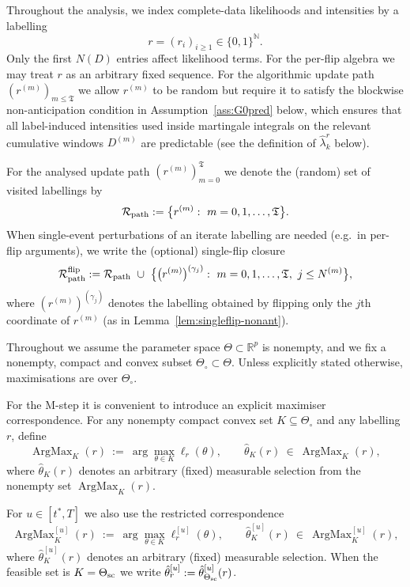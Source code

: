 \documentclass{statsoc}
\newcommand{\bbR}{\mathbb{R}}
\newcommand{\1}{\mathbbm{1}}
\newcommand{\bbN}{\mathbb{N}}
\newcommand{\Tmax}{\mathfrak{T}}
\begin{document}
Throughout the analysis, we index complete-data likelihoods and intensities by a labelling
\[
r=(r_i)_{i\ge 1}\in\{0,1\}^{\bbN}.
\]
Only the first $N(D)$ entries affect likelihood terms. For the per-flip algebra we may treat $r$ as an arbitrary fixed sequence. For the algorithmic update path $(r^{(m)})_{m\le\Tmax}$ we allow $r^{(m)}$ to be random but require it to satisfy the blockwise non-anticipation condition in Assumption~\ref{ass:G0pred} below, which ensures that all label-induced intensities used inside martingale integrals on the relevant cumulative windows $D^{(m)}$ are predictable (see the definition of $\widehat\lambda_k^r$ below).

For the analysed update path $(r^{(m)})_{m=0}^{\Tmax}$ we denote the (random) set of visited labellings by
\[
\mathcal R_{\rm path}
:=\big\{r^{(m)}:\ m=0,1,\dots,\Tmax\big\}.
\]
When single-event perturbations of an iterate labelling are needed (e.g.\ in per-flip arguments),
we write the (optional) single-flip closure
\[
\mathcal R_{\rm path}^{\rm flip}
:=\mathcal R_{\rm path}\ \cup\
\big\{\big(r^{(m)}\big)^{(\gamma_j)}:\ m=0,1,\dots,\Tmax,\ j\le N^{(m)}\big\},
\]
where $(r^{(m)})^{(\gamma_j)}$ denotes the labelling obtained by flipping only the $j$th coordinate of $r^{(m)}$
(as in Lemma~\ref{lem:singleflip-nonant}).



Throughout we assume the parameter space $\Theta\subset\bbR^p$ is nonempty, and we fix a nonempty, compact and convex subset $\Theta_\circ\subset\Theta$. Unless explicitly stated otherwise, maximisations are over $\Theta_\circ$.

For the M-step it is convenient to introduce an explicit maximiser correspondence.
For any nonempty compact convex set $K\subseteq\Theta_\circ$ and any labelling $r$, define
\[
\operatorname{ArgMax}_K(r)\ :=\ \arg\max_{\theta\in K}\ell_r(\theta),
\qquad
\hat\theta_K(r)\ \in\ \operatorname{ArgMax}_K(r),
\]
where $\hat\theta_K(r)$ denotes an arbitrary (fixed) measurable selection from the nonempty set
$\operatorname{ArgMax}_K(r)$.

For $u\in[t^\ast,T]$ we also use the restricted correspondence
\[
\operatorname{ArgMax}_K^{[u]}(r)\ :=\ \arg\max_{\theta\in K}\ell_r^{[u]}(\theta),
\qquad
\hat\theta_K^{[u]}(r)\ \in\ \operatorname{ArgMax}_K^{[u]}(r),
\]
where $\hat\theta_K^{[u]}(r)$ denotes an arbitrary (fixed) measurable selection.
When the feasible set is $K=\Theta_{\rm sc}$ we write $\hat\theta_r^{[u]}:=\hat\theta_{\Theta_{\rm sc}}^{[u]}(r)$.
\end{document}
